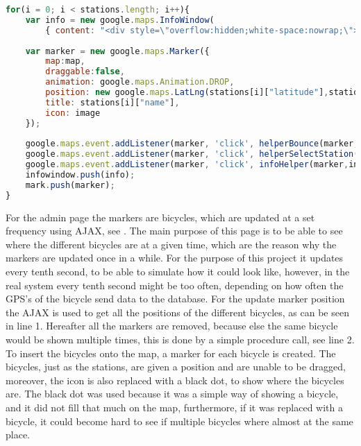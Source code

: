 \begin{minipage}{\textwidth}
\begin{lstlisting}[caption={Construction of stations}, label={lst:creationofstations}, language=Javascript]
for(i = 0; i < stations.length; i++){
	var info = new google.maps.InfoWindow(
		{ content: "<div style=\"overflow:hidden;white-space:nowrap;\"><b>" + stations[i]["name"] + "</b><br/> Available Bicycles: " + freeBicycleList[i+1] + "<br/> Available Docks: " + freeDockList[i+1] + "</div>"});
            
	var marker = new google.maps.Marker({
		map:map,
		draggable:false,
		animation: google.maps.Animation.DROP,
		position: new google.maps.LatLng(stations[i]["latitude"],stations[i]["longitude"]),
		title: stations[i]["name"],
		icon: image
	});
            
	google.maps.event.addListener(marker, 'click', helperBounce(marker,toggleBounce));
	google.maps.event.addListener(marker, 'click', helperSelectStation(SelectStationFromList, marker.title));
	google.maps.event.addListener(marker, 'click', infoHelper(marker,info,map));
	infowindow.push(info);
	mark.push(marker);
}
\end{lstlisting}
\end{minipage}

For the admin page the markers are bicycles, which are updated at a set frequency using AJAX, see .
The main purpose of this page is to be able to see where the different bicycles are at a given time, which are the reason why the markers are updated once in a while.
For the purpose of this project it updates every tenth second, to be able to simulate how it could look like, however, in the real system every tenth second might be too often, depending on how often the GPS's of the bicycle send data to the database.
For the update marker position the AJAX is used to get all the positions of the different bicycles, as can be seen in line 1.
Hereafter all the markers are removed, because else the same bicycle would be shown multiple times, this is done by a simple procedure call, see line 2.
To insert the bicycles onto the map, a marker for each bicycle is created.
The bicycles, just as the stations, are given a position and are unable to be dragged, moreover, the icon is also replaced with a black dot, to show where the bicycles are.
The black dot was used because it was a simple way of showing a bicycle, and it did not fill that much on the map, furthermore, if it was replaced with a bicycle, it could become hard to see if multiple bicycles where almost at the same place.

